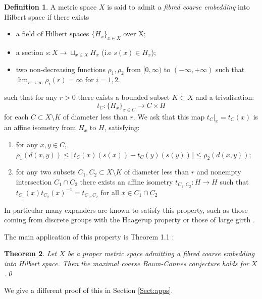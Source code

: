 \documentclass[11pt]{amsart}
\theoremstyle{plain}
\newtheorem{theorem}{Theorem}%
\theoremstyle{definition}%
\newtheorem{definition}[theorem]{Definition}%
\theoremstyle{remark}%
\begin{document}
\begin{definition}
A metric space $X$ is said to admit a \textit{fibred coarse embedding} into Hilbert space if there exists
\begin{itemize}
\item a field of Hilbert spaces $\lbrace H_{x} \rbrace_{x \in X}$ over X;
\item a section $s: X \rightarrow \sqcup_{x \in X}H_{x}$ (i.e $s(x) \in H_{x}$);
\item two non-decreasing functions $\rho_{1}, \rho_{2}$ from $[0,\infty)$ to $(-\infty, +\infty)$ such that $\lim_{r\rightarrow \infty}\rho_{i}(r)=\infty$ for $i=1,2$.
\end{itemize}
such that for any $r>0$ there exists a bounded subset $K\subset X$ and a trivalisation:
\begin{equation*}
t_{C}: \lbrace H_{x} \rbrace_{x \in C} \rightarrow C\times H
\end{equation*}
for each $C \subset X \setminus K$ of diameter less than $r$. We ask that this map $t_{C}|_{x}=t_{C}(x)$ is an affine isometry from  $H_{x}$ to $H$, satisfying:
\begin{enumerate}
\item for any $x,y \in C$, $\rho_{1}(d(x,y))\leq \Vert t_{C}(x)(s(x)) - t_{C}(y)(s(y)) \Vert \leq \rho_{2}(d(x,y))$;
\item for any two subsets $C_{1},C_{2} \subset X\setminus K$ of diameter less than $r$ and nonempty intersection $C_{1}\cap C_{2}$ there exists an affine isometry $t_{C_{1},C_{2}}:H \rightarrow H$ such that $t_{C_{1}}(x)t_{C_{2}}(x)^{-1}=t_{C_{1},C_{2}}$ for all $x \in C_{1}\cap C_{2}$
\end{enumerate}
\end{definition}

In particular many expanders are known to satisfy this property, such as those coming from discrete groups with the Haagerup property  or those of large girth \cite{FCEpaper,MR2568691}.

The main application of this property is Theorem 1.1 \cite{FCEpaper}:

\begin{theorem}\label{Thm:FCEMR}
Let $X$ be a proper metric space admitting a fibred coarse embedding into Hilbert space. Then the maximal coarse Baum-Connes conjecture holds for $X$.\qed
\end{theorem}

We give a different proof of this in Section \ref{Sect:apps}.
\end{document}
